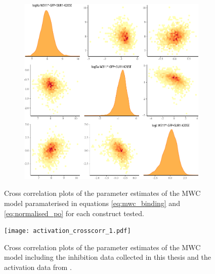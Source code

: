 \begin{figure}[h]
\begin{subfigure}[t]{0.3\textwidth}
	\end{subfigure}
	\hfill
	\begin{subfigure}[t]{0.3\textwidth}
		\caption{}\label{apxfig:inhib_cc_9}
		\centering
		\includegraphics[width=\textwidth]{inhibition_crosscorr_9.pdf}
	\end{subfigure}
	\caption[MWC parameter cross-correlation - inhibition]{
	Cross correlation plots of the parameter estimates of the MWC model paramaterised in equations \ref{eq:mwc_binding} and \ref{eq:normalised_po} for each construct tested.
	}
	\label{apxfig:inhibition_crosscorr}
\end{figure}

\begin{figure}[h]
	\centering
	\texttt{[image: activation\_crosscorr\_1.pdf]}
	\caption[MWC parameter cross-correlation - inhibition and activation]{
	Cross correlation plots of the parameter estimates of the MWC model including the inhibition data collected in this thesis and the activation data from \textcite{puljung_activation_2019-1}.
	}
	\label{apxfig:activation_crosscorr}
\end{figure}
